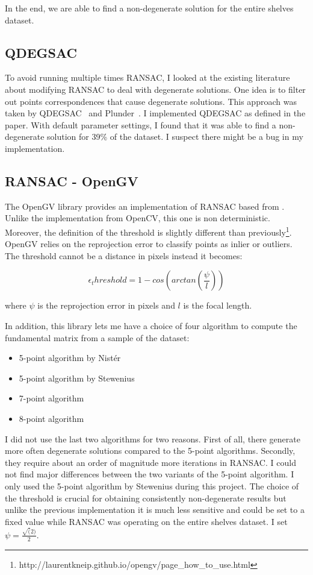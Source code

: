 \documentclass[11pt]{report}
\begin{document}
In the end, we are able to find a non-degenerate solution for the entire shelves dataset.

\subsection{QDEGSAC}

To avoid running multiple times RANSAC, I looked at the existing literature about modifying RANSAC to deal with degenerate solutions. One idea is to filter out points correspondences that cause degenerate solutions. This approach was taken by QDEGSAC~\cite{Qdegsac06} and Plunder~\cite{Plunder95}. I implemented QDEGSAC as defined in the paper. With default parameter settings, I found that it was able to find a non-degenerate solution for 39\% of the dataset. I suspect there might be a bug in my implementation.

\subsection{RANSAC - OpenGV}

The OpenGV library provides an  implementation of RANSAC based from \cite{Ransac97}. Unlike the implementation from OpenCV, this one is non deterministic. Moreover, the definition of the threshold is slightly different than previously\footnote{http://laurentkneip.github.io/opengv/page\_how\_to\_use.html}. OpenGV relies on the reprojection error to classify points as inlier or outliers. The threshold cannot be a distance in pixels instead it becomes:

\begin{equation}
\epsilon_threshold = 1 - cos(arctan(\frac{\psi}{l}))
\end{equation}

where $\psi$ is the reprojection error in pixels and $l$ is the focal length. 

In addition, this library lets me have a choice of four algorithm to compute the fundamental matrix from a sample of the dataset:
\begin{itemize}
  \item 5-point algorithm by Nist\'er \cite{FivePointNister04}
  \item 5-point algorithm by Stewenius \cite{fivepointstewenius}
  \item 7-point algorithm 
  \item 8-point algorithm
\end{itemize}

I did not use the last two algorithms for two reasons. First of all, there generate more often degenerate solutions compared to the 5-point algorithms. Secondly, they require about an order of magnitude more iterations in RANSAC. I could not find major differences between the two variants of the 5-point algorithm. I only used the 5-point algorithm by Stewenius during this project. The choice of the threshold is crucial for obtaining consistently non-degenerate results but unlike the previous implementation it is much less sensitive and could be set to a fixed value while RANSAC was operating on the entire shelves dataset. I set $\psi = \frac{\sqrt(2)}{2}$.
\end{document}
